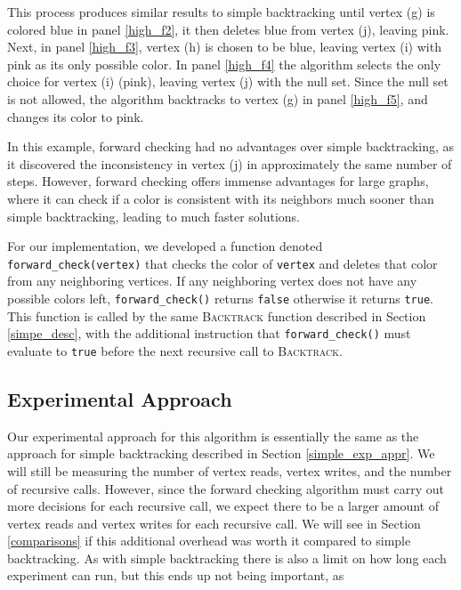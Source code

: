 \documentclass{article}
\begin{document}
		This process produces similar results to simple backtracking until vertex (g) is colored blue in panel \ref{high_f2}, it then deletes blue from vertex (j), leaving pink. Next, in panel \ref{high_f3}, vertex (h) is chosen to be blue, leaving vertex (i) with pink as its only possible color. In panel \ref{high_f4} the algorithm selects the only choice for vertex (i) (pink), leaving vertex (j) with the null set. Since the null set is not allowed, the algorithm backtracks to vertex (g) in panel \ref{high_f5}, and changes its color to pink.
		
		In this example, forward checking had no advantages over simple backtracking, as it discovered the inconsistency in vertex (j) in approximately the same number of steps. However, forward checking offers immense advantages for large graphs, where it can check if a color is consistent with its neighbors much sooner than simple backtracking, leading to much faster solutions.
		
		For our implementation, we developed a function denoted \texttt{forward\_check(vertex)} that checks the color of \texttt{vertex} and deletes that color from any neighboring vertices. If any neighboring vertex does not have any possible colors left, \texttt{forward\_check()} returns \texttt{false} otherwise it returns \texttt{true}. This function is called by the same \textsc{Backtrack} function described in Section \ref{simpe_desc}, with the additional instruction that \texttt{forward\_check()} must evaluate to \texttt{true} before the next recursive call to \textsc{Backtrack}.
		

	\subsection{Experimental Approach}
	
		Our experimental approach for this algorithm is essentially the same as the approach for simple backtracking described in Section \ref{simple_exp_appr}. We will still be measuring the number of vertex reads, vertex writes, and the number of recursive calls. However, since the forward checking algorithm must carry out more decisions for each recursive call, we expect there to be a larger amount of vertex reads and vertex writes for each recursive call. We will see in Section \ref{comparisons} if this additional overhead was worth it compared to simple backtracking. As with simple backtracking there is also a limit on how long each experiment can run, but this ends up not being important, as 
	
\end{document}
